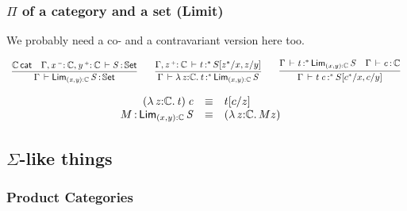 \documentclass[11pt]{article}
\theoremstyle{plain}
\begin{document}
%

\subsubsection{$\Pi$ of a category and a set (Limit)}
We probably need a co- and a contravariant version here too.

\[
\begin{array}{c}
\infer{\ofdtp{\Gamma}{\picat{(x,y)}{\C}{S}}{\types}}
      {\wfdtp{\C} &
        \ofdtp{\Gamma,\catvar{x}{\con}{\C},\catvar{y}{\co}{\C}}{S}{\types}}
\qquad
\infer{\oftpe{\Gamma}{\lam{z}{\C}{t}}{\vcond}{\picat {(x,y)} \C S}}
      {\oftpe{\Gamma,\catvar{z}{\co}{\C}}{t}{\vcond}{\tsubst{S}{z^*/x,z/y}}}
\qquad
\infer{\oftpe{\Gamma}{\app t {c}}{\vcond}{\tsubst S {c^*/x,c/y}}}
      {\oftpe{\Gamma}{t}{\vcond}{\picat{(x,y)}{\C}{S}} &
        \ofdtp{\Gamma}{c}{\C}}
\end{array}
\]

\[
\begin{array}{rcll}
\mathit{({\lambda\,z \mathit{:} \mathbb{C}.\,t}) \: c} & \equiv & t [ c / z ] \\
M \, \mathit{:} \, \textnormal{\ensuremath{\mathsf{Lim}}}_{(x,y) \mathit{:} \mathbb{C}} \,\mathit{S} & \equiv & {({\lambda\,z \mathit{:} \mathbb{C}.\,M}{z})} &
\end{array} \\
\]

\subsection{$\Sigma$-like things}

\subsubsection{Product Categories}
\end{document}

